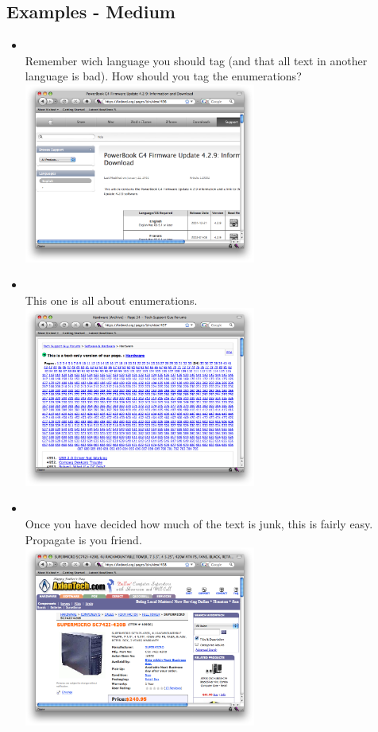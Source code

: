 \documentclass[12pt]{article}
\begin{document}
\subsection{Examples - Medium}
\label{ExMedium}
\begin{itemize}
\item {} \\
Remember wich language you should tag (and that all text in another language is bad). How should you tag the enumerations? \\
\includegraphics[width=0.6\textwidth]{images/436.png} \\

\item {} \\
This one is all about enumerations. \\
\includegraphics[width=0.6\textwidth]{images/437.png} \\

\item {} \\
Once you have decided how much of the text is junk, this is fairly easy. Propagate is you friend. \\
\includegraphics[width=0.6\textwidth]{images/438.png} \\


\end{itemize}
\end{document}
